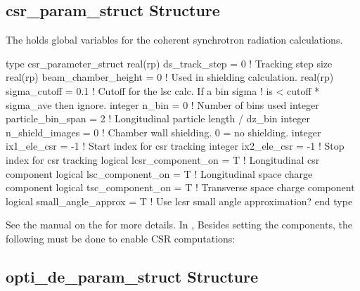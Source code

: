 {{{{{{{{\subsection{csr\_param\_struct Structure}
\label{s:csr.param.struct} 

The  holds global variables for the coherent
synchrotron radiation calculations. 
\begin{example}
  type csr_parameter_struct
    real(rp) ds_track_step = 0          ! Tracking step size
    real(rp) beam_chamber_height = 0    ! Used in shielding calculation.
    real(rp) sigma_cutoff = 0.1         ! Cutoff for the lsc calc. If a bin sigma
                                           !  is < cutoff * sigma_ave then ignore.
    integer n_bin = 0                   ! Number of bins used
    integer particle_bin_span = 2       ! Longitudinal particle length / dz_bin
    integer n_shield_images = 0         ! Chamber wall shielding. 0 = no shielding.
    integer ix1_ele_csr = -1            ! Start index for csr tracking
    integer ix2_ele_csr = -1            ! Stop index for csr tracking
    logical lcsr_component_on = T       ! Longitudinal csr component
    logical lsc_component_on = T        ! Longitudinal space charge component
    logical tsc_component_on = T        ! Transverse space charge component
    logical small_angle_approx = T      ! Use lcsr small angle approximation?
  end type
\end{example}
See the \bmad manual on the  for more details. In \tao,
Besides setting the  components, the following must
be done to enable CSR computations:

\subsection{opti\_de\_param\_struct Structure}
\label{s:opti.de.param.struct}

}}}}}}}}
